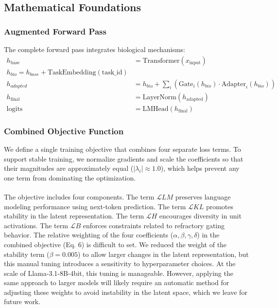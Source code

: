 \documentclass[11pt, letterpaper]{article}
\begin{document}
\subsection{Mathematical Foundations}

\subsubsection{Augmented Forward Pass}
The complete forward pass integrates biological mechanisms:
\begin{align}
    h_{\text{base}} &= \text{Transformer}(x_{\text{input}}) \\
    h_{bio} = h_{base} + \text{TaskEmbedding}(\text{task\_id}) \\
    h_{adapted} &= h_{bio} + \sum_{i} (\text{Gate}_{i}(h_{bio}) \cdot \text{Adapter}_{i}(h_{bio})) \\
    h_{\text{final}} &= \text{LayerNorm}(h_{\text{adapted}}) \\
    \text{logits} &= \text{LMHead}(h_{\text{final}})
\end{align}

\subsubsection{Combined Objective Function}
We define a single training objective that combines four separate loss terms. To support stable training, we normalize gradients and scale the coefficients so that their magnitudes are approximately equal ($|\lambda_i| \approx 1.0$), which helps prevent any one term from dominating the optimization.

\paragraph{}
The objective includes four components. The term $\mathcal{L}{LM}$ preserves language modeling performance using next-token prediction. The term $\mathcal{L}{KL}$ promotes stability in the latent representation. The term $\mathcal{L}{H}$ encourages diversity in unit activations. The term $\mathcal{L}{B}$ enforces constraints related to refractory gating behavior.
The relative weighting of the four coefficients ($\alpha, \beta, \gamma, \delta$) in the combined objective (Eq. 6) is difficult to set. We reduced the weight of the stability term ($\beta = 0.005$) to allow larger changes in the latent representation, but this manual tuning introduces a sensitivity to hyperparameter choices. At the scale of Llama-3.1-8B-4bit, this tuning is manageable. However, applying the same approach to larger models will likely require an automatic method for adjusting these weights to avoid instability in the latent space, which we leave for future work.
\end{document}
